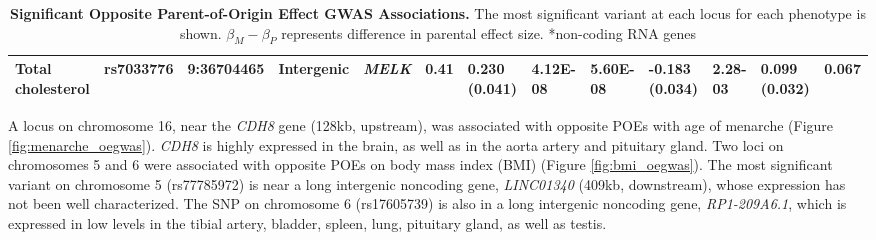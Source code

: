 \begin{table}
\begin{adjustbox}{width={\textwidth}}
\begin{tabular}{@{}p{3cm}|p{1.8cm}p{2cm}p{2cm}p{2cm}p{0.8cm}p{1.8cm}p{2.5cm}|p{1.8cm}p{1.8cm}|p{1.8cm}p{1.8cm}|p{1.8cm}@{}}
Total cholesterol & rs7033776 & 9:36704465 & Intergenic & \emph{MELK} & 0.41 & 0.230 (0.041) & 4.12E-08 & 5.60E-08	& -0.183 (0.034) & 2.28-03 & 0.099 (0.032) & 0.067\\ \hline
\bottomrule
\end{tabular}
\end{adjustbox}
\caption[Significant Opposite Parent-of-Origin Effect GWAS Associations.]{\textbf{Significant Opposite Parent-of-Origin Effect GWAS Associations.} The most significant variant at each locus for each phenotype is shown.  $\beta_{M}-\beta_{P}$ represents difference in parental effect size.
*non-coding RNA genes
}
\label{tab:oppparent}
\end{table}




A locus on chromosome 16, near the \emph{CDH8} gene (128kb, upstream), was associated with opposite POEs with age of menarche (Figure \ref{fig:menarche_oegwas}). \emph{CDH8} is highly expressed in the brain, as well as in the aorta artery and pituitary gland. Two loci on chromosomes 5 and 6 were associated with opposite POEs on body mass index (BMI) (Figure \ref{fig:bmi_oegwas}). The most significant variant on chromosome 5 (rs77785972) is near a long intergenic noncoding gene, \emph{LINC01340} (409kb, downstream), whose expression has not been well characterized. The SNP on chromosome 6 (rs17605739) is also in a long intergenic noncoding gene, \emph{RP1-209A6.1}, which is expressed in low levels in the tibial artery, bladder, spleen, lung, pituitary gland, as well as testis. 


